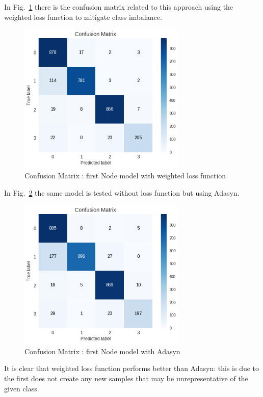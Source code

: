 \documentclass[LaM,binding=0.6cm]{sapthesis}
\begin{document}
In Fig.~\ref{fig:odetestwl} there is the confusion matrix related to this approach using the weighted loss function to mitigate class imbalance.
\begin{figure}[H]  \centering
	\includegraphics[width=80mm,scale=0.7]{odetestwl.png}
	\caption{Confusion Matrix : first Node model with weighted loss function}
	\label{fig:odetestwl}
\end{figure}
In Fig.~\ref{fig:odetestada} the same model is tested without loss function but using Adasyn.
\begin{figure}[H]  \centering
	\includegraphics[width=80mm,scale=0.7]{odetestada.png}
	\caption{Confusion Matrix : first Node model with Adasyn}
	\label{fig:odetestada}
\end{figure}
It is clear that weighted loss function performs better than Adasyn: this is due to the first does not create any new samples that may be unrepresentative of the given class. 
\end{document}
